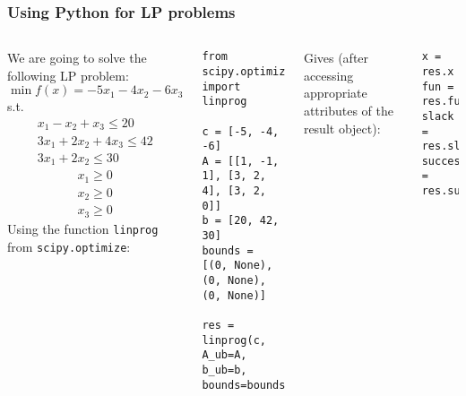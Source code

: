 \begin{frame}[fragile]
  \frametitle{Using Python for LP problems}
  \begin{columns}
    We are going to solve the following LP problem:\\
    \[
    \min f(x) = -5x_1 -4x_2 - 6x_3 
    \] 
    s.t. \\
    \[
    \begin{array}{l}
    x_1 - x_2 + x_3 \leq 20 \\
    3x_1 + 2x_2 + 4x_3 \leq 42 \\
    3x_1 + 2x_2 \leq 30 
    \end{array}
    \]
    \[
    \begin{array}{l}
    x_1 \geq 0 \\
    x_2 \geq 0 \\
    x_3 \geq 0
    \end{array}
    \]
    Using the function \lstinline|linprog| from \lstinline|scipy.optimize|:
    \begin{lstlisting}
from scipy.optimize import linprog

c = [-5, -4, -6]
A = [[1, -1, 1], [3, 2, 4], [3, 2, 0]]
b = [20, 42, 30]
bounds = [(0, None), (0, None), (0, None)]

res = linprog(c, A_ub=A, b_ub=b, bounds=bounds)
    \end{lstlisting}
Gives (after accessing appropriate attributes of the result object):
    \begin{lstlisting}
x = res.x
fun = res.fun
slack = res.slack
success = res.success
    \end{lstlisting}
  \end{columns}
\end{frame}


